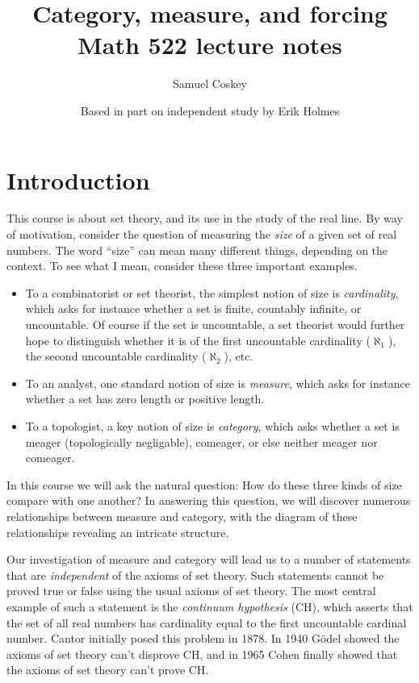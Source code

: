 \documentclass[11pt,oneside]{amsbook}
\title[Category, measure, and forcing]{Category, measure, and forcing\\Math 522 lecture notes}
\author{Samuel Coskey}
\author{Based in part on independent study by Erik Holmes}
\theoremstyle{definition}
\theoremstyle{plain}
\theoremstyle{definition}
\theoremstyle{remark}
\numberwithin{equation}{section}
\numberwithin{figure}{section}
\begin{document}
\maketitle

\tableofcontents

\chapter*{Introduction}

This course is about set theory, and its use in the study of the real line. By way of motivation, consider the question of measuring the \emph{size} of a given set of real numbers. The word ``size'' can mean many different things, depending on the context. To see what I mean, consider these three important examples.

\begin{itemize}
  \item To a combinatorist or set theorist, the simplest notion of size is
\emph{cardinality}, which asks for instance whether a set is finite, countably infinite, or uncountable. Of course if the set is uncountable, a set theorist would further hope to distinguish whether it is of the first uncountable cardinality ($\aleph_1$), the second uncountable cardinality ($\aleph_2$), etc.
  \item To an analyst, one standard notion of size is \emph{measure}, which asks for instance whether a set has zero length or positive length.
  \item To a topologist, a key notion of size is \emph{category}, which asks whether a set is meager (topologically negligable), comeager, or else neither meager nor comeager.
\end{itemize}

In this course we will ask the natural question: How do these three kinds of size compare with one another? In answering this question, we will discover numerous relationships between measure and category, with the diagram of these relationships revealing an intricate structure.

Our investigation of measure and category will lead us to a number of statements that are \emph{independent} of the axioms of set theory. Such statements cannot be proved true or false using the usual axioms of set theory. The most central example of such a statement is the \emph{continuum hypothesis} (CH), which asserts that the set of all real numbers has cardinality equal to the first uncountable cardinal number. Cantor initially posed this problem in 1878. In 1940 G\"odel showed the axioms of set theory can't disprove CH, and in 1965 Cohen finally showed that the axioms of set theory can't prove CH.
\end{document}
